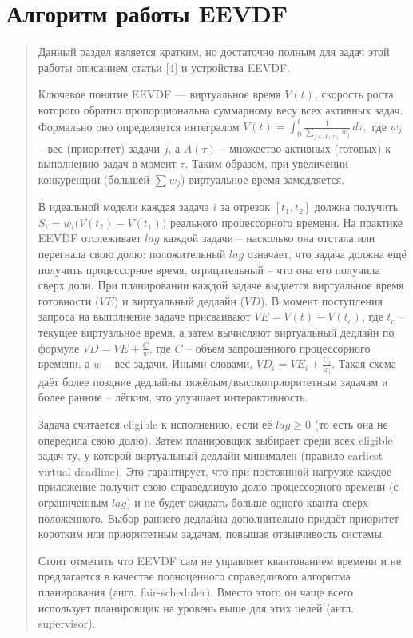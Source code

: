 \documentclass[12pt, oneside]{book}
\begin{document}
\section{Алгоритм работы EEVDF}
\begin{quote}
  Данный раздел является кратким, но достаточно полным для задач этой работы
  описанием статьи [4] и устройства EEVDF.

  Ключевое понятие EEVDF --- виртуальное время $ V(t) $, скорость роста
  которого обратно пропорциональна суммарному весу всех активных задач.
  Формально оно определяется интегралом $ V(t) = \int_{0}^{t} 
  \frac{1}{\sum_{j\in A(\tau)}w_j}\,d\tau, $ где $ w_j $ -- вес (приоритет)
  задачи $ j $, а $ A(\tau) $ -- множество активных (готовых) к выполнению задач
  в момент $ \tau $. Таким образом, при увеличении конкуренции 
  (большей $ \sum w_j $) виртуальное время замедляется.

  В идеальной модели каждая задача $ i $ за отрезок $ [t_1 , t_2] $
  должна получить $ S_i = w_i\bigl(V(t_2)-V(t_1)\bigr) $ реального
  процессорного времени. На практике EEVDF отслеживает $ lag $ каждой задачи
  -- насколько она отстала или перегнала свою долю: положительный
  $ lag $ означает, что задача должна ещё получить процессорное время,
  отрицательный -- что она его получила сверх доли.
  При планировании каждой задаче выдается виртуальное время готовности 
  ($ VE $) и виртуальный дедлайн ($ VD $). В момент поступления запроса на
  выполнение задаче присваивают $ VE = V(t) - V(t_c) $, где $ t_c $ -- текущее
  виртуальное время, а затем вычисляют виртуальный дедлайн по формуле 
  $ VD = VE + \frac{C}{w} $, где $ C $ -- объём запрошенного процессорного
  времени, а $ w $ – вес задачи. Иными словами, $ VD_i = VE_i + \frac{C_i}{w_i} $.
  Такая схема даёт более поздние дедлайны тяжёлым/высокоприоритетным задачам и
  более ранние -- лёгким, что улучшает интерактивность.
  
  Задача считается eligible к исполнению, если её $ lag \geq 0 $
  (то есть она не опередила свою долю).
  Затем планировщик выбирает среди всех eligible задач ту, у которой виртуальный 
  дедлайн минимален (правило earliest virtual deadline). Это гарантирует, что при
  постоянной нагрузке каждое приложение получит свою справедливую долю
  процессорного времени (с ограниченным $ lag $) и не будет ожидать больше одного
  кванта сверх положенного. Выбор раннего дедлайна дополнительно
  придаёт приоритет коротким или приоритетным задачам, повышая отзывчивость системы.

  Стоит отметить что EEVDF сам не управляет квантованием времени и не
  предлагается в качестве полноценного справедливого алгоритма планирования
  (англ. fair-scheduler). Вместо этого он чаще всего использует планировщик на
  уровень выше для этих целей (англ. supervisor).


\end{quote}
\end{document}
